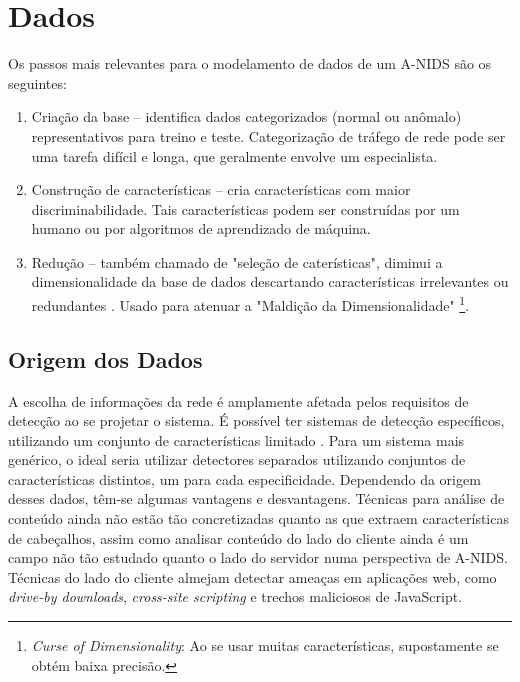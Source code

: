 \chapter{Dados}
\label{ch:dados}
Os passos mais relevantes para o modelamento de dados de um A-NIDS são os seguintes:
\begin{enumerate}
    \item Criação da base -- identifica dados categorizados (normal ou anômalo) representativos para treino e teste.
    Categorização de tráfego de rede pode ser uma tarefa difícil e longa, que geralmente envolve um especialista.
    \item Construção de características -- cria características com maior discriminabilidade. Tais características
    podem ser construídas por um humano ou por algoritmos de aprendizado de máquina.
    \item Redução -- também chamado de "seleção de caterísticas", diminui a dimensionalidade da base de dados
    descartando características irrelevantes ou redundantes \cite{song13}. Usado para atenuar a "Maldição da
    Dimensionalidade" \footnote{\textit{Curse of Dimensionality}: Ao se usar muitas características,
    supostamente se obtém baixa precisão.}.
\end{enumerate}


\section{Origem dos Dados}
A escolha de informações da rede é amplamente afetada pelos requisitos de detecção ao se projetar o sistema.
É possível ter sistemas de detecção específicos, utilizando um conjunto de características limitado \cite{guanzhong09}.
Para um sistema mais genérico, o ideal seria utilizar detectores separados utilizando conjuntos de características
distintos, um para cada especificidade. Dependendo da origem desses dados, têm-se algumas vantagens e desvantagens.
Técnicas para análise de conteúdo ainda não estão tão concretizadas quanto as que extraem características de
cabeçalhos, assim como analisar conteúdo do lado do cliente ainda é um campo não tão estudado quanto o lado do servidor
numa perspectiva de A-NIDS. Técnicas do lado do cliente almejam detectar ameaças em aplicações web, como \textit{drive-by
downloads}, \textit{cross-site scripting} e trechos maliciosos de JavaScript.

